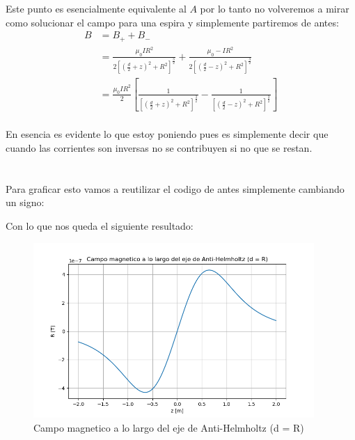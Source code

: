 \documentclass{report}
\begin{document}
Este punto es esencialmente equivalente al $A$ por lo tanto no volveremos a mirar como solucionar el campo para una espira y simplemente partiremos de antes:
\begin{align*}
	B &= B_+ + B_-\\
	& = \frac{\mu_0 I R^2}{2\left[ \left(\frac{d}{2} + z\right)^2 + R^2\right]^{\frac{3}{2}}} + \frac{\mu_0 - I R^2}{2\left[ \left(\frac{d}{2} - z\right)^2 + R^2\right]^{\frac{3}{2}}}\\
	& = \frac{\mu_0 I R^2}{2} \left[\frac{1}{\left[ \left(\frac{d}{2} + z\right)^2 + R^2\right]^{\frac{3}{2}}} - \frac{1}{\left[ \left(\frac{d}{2} - z\right)^2 + R^2\right]^{\frac{3}{2}}}\right]\\
\end{align*}

En esencia es evidente lo que estoy poniendo pues es simplemente decir que cuando las corrientes son inversas no se contribuyen si no que se restan.

\section{}

Para graficar esto vamos a reutilizar el codigo de antes simplemente cambiando un signo:



Con lo que nos queda el siguiente resultado:
\begin{figure}[H]
	\begin{center}
		\includegraphics[width=0.95\textwidth]{img/punto_12_e.png}
	\end{center}
	\caption{Campo magnetico a lo largo del eje de Anti-Helmholtz (d = R)}\label{fig:}
\end{figure}
\end{document}
